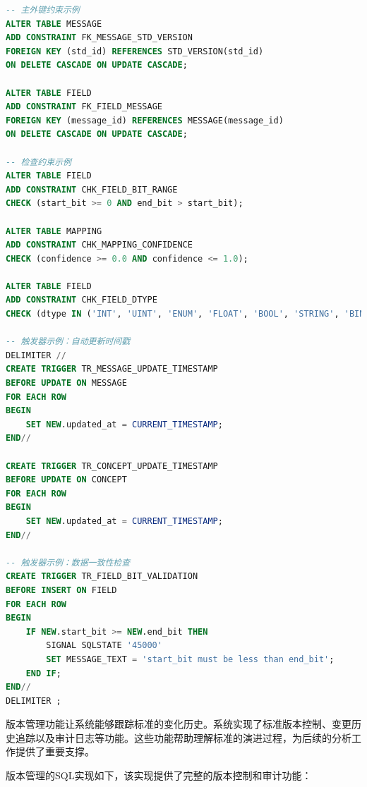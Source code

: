 \begin{lstlisting}[language=SQL, label=fig:database_constraints]
-- 主外键约束示例
ALTER TABLE MESSAGE 
ADD CONSTRAINT FK_MESSAGE_STD_VERSION 
FOREIGN KEY (std_id) REFERENCES STD_VERSION(std_id) 
ON DELETE CASCADE ON UPDATE CASCADE;

ALTER TABLE FIELD 
ADD CONSTRAINT FK_FIELD_MESSAGE 
FOREIGN KEY (message_id) REFERENCES MESSAGE(message_id) 
ON DELETE CASCADE ON UPDATE CASCADE;

-- 检查约束示例
ALTER TABLE FIELD 
ADD CONSTRAINT CHK_FIELD_BIT_RANGE 
CHECK (start_bit >= 0 AND end_bit > start_bit);

ALTER TABLE MAPPING 
ADD CONSTRAINT CHK_MAPPING_CONFIDENCE 
CHECK (confidence >= 0.0 AND confidence <= 1.0);

ALTER TABLE FIELD 
ADD CONSTRAINT CHK_FIELD_DTYPE 
CHECK (dtype IN ('INT', 'UINT', 'ENUM', 'FLOAT', 'BOOL', 'STRING', 'BINARY'));

-- 触发器示例：自动更新时间戳
DELIMITER //
CREATE TRIGGER TR_MESSAGE_UPDATE_TIMESTAMP
BEFORE UPDATE ON MESSAGE
FOR EACH ROW
BEGIN
    SET NEW.updated_at = CURRENT_TIMESTAMP;
END//

CREATE TRIGGER TR_CONCEPT_UPDATE_TIMESTAMP
BEFORE UPDATE ON CONCEPT
FOR EACH ROW
BEGIN
    SET NEW.updated_at = CURRENT_TIMESTAMP;
END//

-- 触发器示例：数据一致性检查
CREATE TRIGGER TR_FIELD_BIT_VALIDATION
BEFORE INSERT ON FIELD
FOR EACH ROW
BEGIN
    IF NEW.start_bit >= NEW.end_bit THEN
        SIGNAL SQLSTATE '45000' 
        SET MESSAGE_TEXT = 'start_bit must be less than end_bit';
    END IF;
END//
DELIMITER ;
\end{lstlisting}

版本管理功能让系统能够跟踪标准的变化历史。系统实现了标准版本控制、变更历史追踪以及审计日志等功能。这些功能帮助理解标准的演进过程，为后续的分析工作提供了重要支撑。

版本管理的SQL实现如下，该实现提供了完整的版本控制和审计功能：

